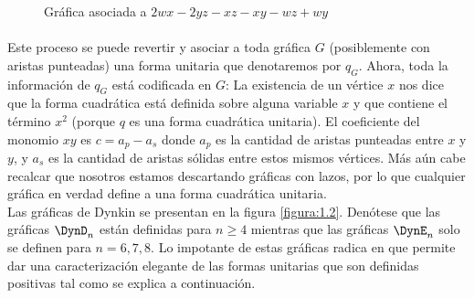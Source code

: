 \begin{figure}[H]
\begin{center}
\caption{Gráfica asociada a  $2wx -2yz - xz - xy - wz + wy$}
\label{figura:1.1}
\end{center}
\end{figure}

\paragraph*{}
Este proceso se puede revertir y asociar a toda gráfica $G$ (posiblemente con aristas punteadas) una forma unitaria que denotaremos por \textbf{$q_{G}$}. Ahora, toda la información de $q_{G}$ está codificada en $G$: La existencia de un vértice $x$ nos dice que la forma cuadrática está definida sobre alguna variable $x$ y que contiene el término $x^{2}$ (porque $q$ es una forma cuadrática unitaria). El coeficiente del monomio $xy$ es $c = a_{p} - a_{s}$ donde $a_{p}$ es la cantidad de aristas punteadas entre $x$ y $y$, y $a_{s}$ es la cantidad de aristas sólidas entre estos mismos vértices. Más aún cabe recalcar que nosotros estamos descartando gráficas con lazos, por lo que cualquier gráfica en verdad define a una forma cuadrática unitaria.\\
Las gráficas de Dynkin se presentan en la figura \ref{figura:1.2}. Denótese que las gráficas $\DynD_{n}$ están definidas para $n \geq 4$ mientras que las gráficas $\DynE_{n}$ solo se definen para $n = 6, 7, 8$. Lo impotante de estas gráficas radica en que permite dar una caracterización elegante de las formas unitarias que son definidas positivas tal como se explica a continuación.

